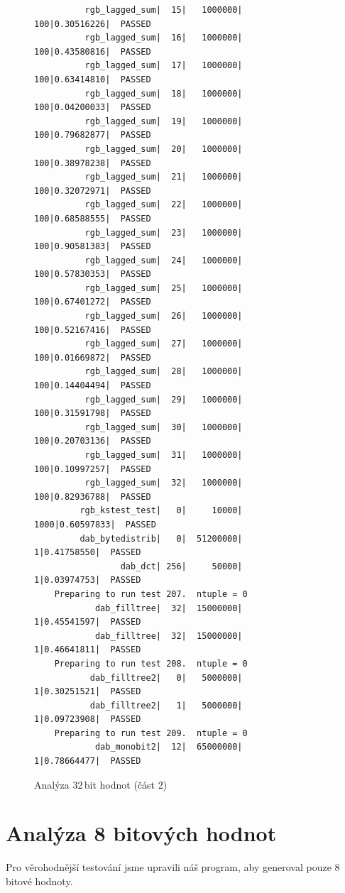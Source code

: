 \documentclass[11pt, a4paper, titlepage]{article}
\begin{document}
\begin{figure}[H]
\begin{verbatim}
          rgb_lagged_sum|  15|   1000000|     100|0.30516226|  PASSED
          rgb_lagged_sum|  16|   1000000|     100|0.43580816|  PASSED
          rgb_lagged_sum|  17|   1000000|     100|0.63414810|  PASSED
          rgb_lagged_sum|  18|   1000000|     100|0.04200033|  PASSED
          rgb_lagged_sum|  19|   1000000|     100|0.79682877|  PASSED
          rgb_lagged_sum|  20|   1000000|     100|0.38978238|  PASSED
          rgb_lagged_sum|  21|   1000000|     100|0.32072971|  PASSED
          rgb_lagged_sum|  22|   1000000|     100|0.68588555|  PASSED
          rgb_lagged_sum|  23|   1000000|     100|0.90581383|  PASSED
          rgb_lagged_sum|  24|   1000000|     100|0.57830353|  PASSED
          rgb_lagged_sum|  25|   1000000|     100|0.67401272|  PASSED
          rgb_lagged_sum|  26|   1000000|     100|0.52167416|  PASSED
          rgb_lagged_sum|  27|   1000000|     100|0.01669872|  PASSED
          rgb_lagged_sum|  28|   1000000|     100|0.14404494|  PASSED
          rgb_lagged_sum|  29|   1000000|     100|0.31591798|  PASSED
          rgb_lagged_sum|  30|   1000000|     100|0.20703136|  PASSED
          rgb_lagged_sum|  31|   1000000|     100|0.10997257|  PASSED
          rgb_lagged_sum|  32|   1000000|     100|0.82936788|  PASSED
         rgb_kstest_test|   0|     10000|    1000|0.60597833|  PASSED
         dab_bytedistrib|   0|  51200000|       1|0.41758550|  PASSED
                 dab_dct| 256|     50000|       1|0.03974753|  PASSED
    Preparing to run test 207.  ntuple = 0
            dab_filltree|  32|  15000000|       1|0.45541597|  PASSED
            dab_filltree|  32|  15000000|       1|0.46641811|  PASSED
    Preparing to run test 208.  ntuple = 0
           dab_filltree2|   0|   5000000|       1|0.30251521|  PASSED
           dab_filltree2|   1|   5000000|       1|0.09723908|  PASSED
    Preparing to run test 209.  ntuple = 0
            dab_monobit2|  12|  65000000|       1|0.78664477|  PASSED
    \end{verbatim}
    \caption{Analýza 32\,bit hodnot (část 2)}
    \label{tab:analysis_32b_2}
\end{figure}


\newpage

\section{Analýza 8 bitových hodnot}

Pro věrohodnější testování jsme upravili náš program, aby generoval pouze 8\,bitové hodnoty.
\end{document}
